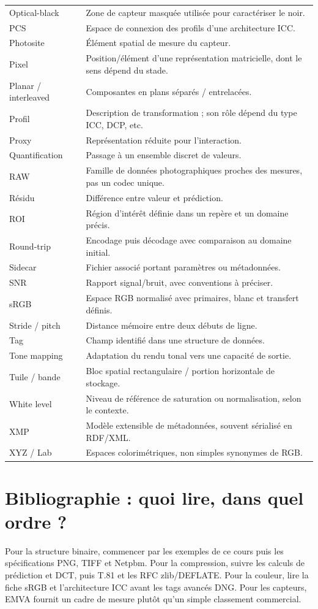 \begin{longtable}{p{3.4cm}p{11.2cm}}
Optical-black & Zone de capteur masquée utilisée pour caractériser le noir. \\
PCS & Espace de connexion des profils d'une architecture ICC. \\
Photosite & Élément spatial de mesure du capteur. \\
Pixel & Position/élément d'une représentation matricielle, dont le sens dépend du stade. \\
Planar / interleaved & Composantes en plans séparés / entrelacées. \\
Profil & Description de transformation ; son rôle dépend du type ICC, DCP, etc. \\
Proxy & Représentation réduite pour l'interaction. \\
Quantification & Passage à un ensemble discret de valeurs. \\
RAW & Famille de données photographiques proches des mesures, pas un codec unique. \\
Résidu & Différence entre valeur et prédiction. \\
ROI & Région d'intérêt définie dans un repère et un domaine précis. \\
Round-trip & Encodage puis décodage avec comparaison au domaine initial. \\
Sidecar & Fichier associé portant paramètres ou métadonnées. \\
SNR & Rapport signal/bruit, avec conventions à préciser. \\
sRGB & Espace RGB normalisé avec primaires, blanc et transfert définis. \\
Stride / pitch & Distance mémoire entre deux débuts de ligne. \\
Tag & Champ identifié dans une structure de données. \\
Tone mapping & Adaptation du rendu tonal vers une capacité de sortie. \\
Tuile / bande & Bloc spatial rectangulaire / portion horizontale de stockage. \\
White level & Niveau de référence de saturation ou normalisation, selon le contexte. \\
XMP & Modèle extensible de métadonnées, souvent sérialisé en RDF/XML. \\
XYZ / Lab & Espaces colorimétriques, non simples synonymes de RGB. \\
\bottomrule
\end{longtable}

\section{Bibliographie : quoi lire, dans quel ordre ?}
Pour la structure binaire, commencer par les exemples de
ce cours puis les spécifications PNG, TIFF et Netpbm.
Pour la compression, suivre les calculs de prédiction et
DCT, puis T.81 et les RFC zlib/DEFLATE. Pour la couleur,
lire la fiche sRGB et l'architecture ICC avant les tags
avancés DNG. Pour les capteurs, EMVA fournit un cadre de
mesure plutôt qu'un simple classement commercial.

